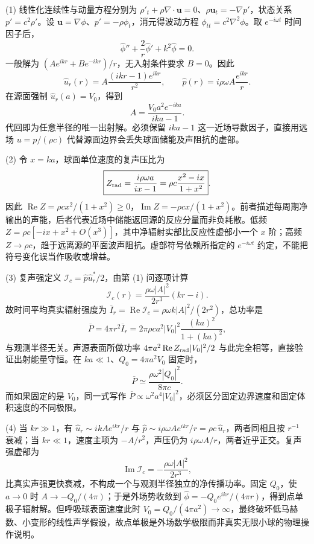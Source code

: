 (1) 线性化连续性与动量方程分别为 \(\rho'_t+\rho\nabla\cdot\boldsymbol u=0\)、\(\rho\boldsymbol u_t=-\nabla p'\)，状态关系 \(p'=c^2\rho'\)。设 \(\boldsymbol u=\nabla\phi\)、\(p'=-\rho\phi_t\)，消元得波动方程 \(\phi_{tt}=c^2\nabla^2\phi\)。取 \(e^{-i\omega t}\) 时间因子后，
\[
\widehat\phi''+\frac2r\widehat\phi'+k^2\widehat\phi=0.
\]
一般解为 \((Ae^{ikr}+Be^{-ikr})/r\)，无入射条件要求 \(B=0\)。因此
\[
\widehat u_r(r)=A\frac{(ikr-1)e^{ikr}}{r^2},\qquad
\widehat p(r)=i\rho\omega A\frac{e^{ikr}}r.
\]
在源面强制 \(\widehat u_r(a)=V_0\)，得到
\[
\boxed{A=\frac{V_0a^2e^{-ika}}{ika-1}}.
\]
代回即为任意半径的唯一出射解。必须保留 \(ika-1\) 这一近场导数因子，直接用远场 \(u=p/(\rho c)\) 代替源面边界会丢失球面储能及声阻抗的虚部。

(2) 令 \(x=ka\)，球面单位速度的复声压比为
\[
\boxed{Z_{\rm rad}=\frac{i\rho\omega a}{ix-1}
=\rho c\frac{x^2-ix}{1+x^2}}.
\]
因此 \(\operatorname{Re}Z=\rho c x^2/(1+x^2)\ge0\)，\(\operatorname{Im}Z=-\rho cx/(1+x^2)\)。前者描述每周期净输出的声能，后者代表近场中储能返回源的反应分量而非负耗散。低频
\(Z=\rho c[-ix+x^2+O(x^3)]\)，其中净辐射实部比反应性虚部小一个 \(x\) 阶；高频 \(Z\to\rho c\)，趋于远离源的平面波声阻抗。虚部符号依赖所指定的 \(e^{-i\omega t}\) 约定，不能把符号变化误当作吸收或增益。

(3) 复声强定义 \(\mathscr I_c=\widehat p\widehat u_r^*/2\)，由第 (1) 问逐项计算
\[
\mathscr I_c(r)=\frac{\rho\omega|A|^2}{2r^3}(kr-i).
\]
故时间平均真实辐射强度为
\(\overline I_r=\operatorname{Re}\mathscr I_c=\rho\omega k|A|^2/(2r^2)\)，总功率是
\[
\boxed{\overline P=4\pi r^2\overline I_r
=2\pi\rho c a^2|V_0|^2\frac{(ka)^2}{1+(ka)^2}},
\]
与观测半径无关。声源表面所做功率 \(4\pi a^2 \operatorname{Re}Z_{\rm rad}|V_0|^2/2\) 与此完全相等，直接验证出射能量守恒。在 \(ka\ll1\)、\(Q_0=4\pi a^2V_0\) 固定时，
\[
\boxed{\overline P\simeq\frac{\rho\omega^2|Q_0|^2}{8\pi c}}.
\]
而如果固定的是 \(V_0\)，同一式写作 \(\overline P\propto\omega^2a^4|V_0|^2\)，必须区分固定边界速度和固定体积速度的不同极限。

(4) 当 \(kr\gg1\)，有 \(\widehat u_r\sim ikA e^{ikr}/r\) 与 \(\widehat p\sim i\rho\omega A e^{ikr}/r=\rho c\,\widehat u_r\)，两者同相且按 \(r^{-1}\) 衰减；当 \(kr\ll1\)，速度主项为 \(-A/r^2\)，声压仍为 \(i\rho\omega A/r\)，两者近乎正交。复声强虚部为
\[
\boxed{\operatorname{Im}\mathscr I_c=-\frac{\rho\omega|A|^2}{2r^3}},
\]
比真实声强更快衰减，不构成一个与观测半径独立的净传播功率。固定 \(Q_0\)，使 \(a\to0\) 时 \(A\to-Q_0/(4\pi)\)；于是外场势收敛到 \(\widehat\phi=-Q_0e^{ikr}/(4\pi r)\)，得到点单极子辐射解。但呼吸球表面速度此时 \(V_0=Q_0/(4\pi a^2)\to\infty\)，最终破坏低马赫数、小变形的线性声学假设，故点单极是外场数学极限而非真实无限小球的物理操作说明。